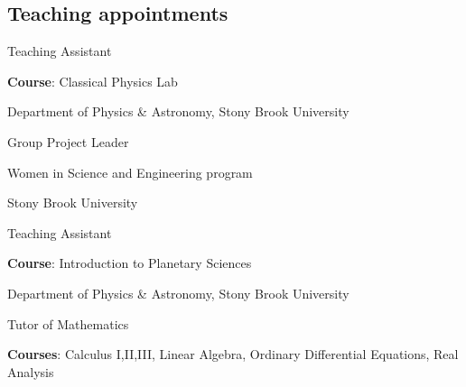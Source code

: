 \documentclass[10pt]{article} %
\begin{document}
\begin{paracol}{1}

	






	


\section{Teaching appointments} 
	{Teaching Assistant}
	{\textbf{Course}: Classical Physics Lab
	
	Department of Physics \& Astronomy, Stony Brook University}

	{Group Project Leader}
	{ Women in Science and Engineering program
	
	Stony Brook University}
	
	{Teaching Assistant}
	{\textbf{Course}: Introduction to Planetary Sciences
	
	Department of Physics \& Astronomy, Stony Brook University}
	
	
	{Tutor of Mathematics}
	{\textbf{Courses}: Calculus I,II,III, Linear Algebra, Ordinary Differential Equations, Real Analysis
	
}
\end{paracol}
\end{document}
